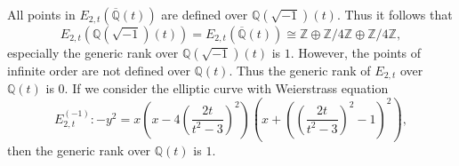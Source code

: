 \documentclass[main]{subfiles}
\begin{document}
\begin{rem}
    All points in $E_{2,t}(\overline{\mathbb{Q}}(t))$ are defined over $\mathbb{Q}(\sqrt{-1})(t)$.
    Thus it follows that
    \begin{equation*}
        E_{2,t}(\mathbb{Q}({\sqrt{-1}})(t)) = E_{2,t}(\overline{\mathbb{Q}}(t)) \cong \mathbb{Z} \oplus \mathbb{Z} / 4 \mathbb{Z} \oplus \mathbb{Z} / 4 \mathbb{Z},
    \end{equation*}
    especially the generic rank over $\mathbb{Q}(\sqrt{-1})(t)$ is $1$.
    However, the points of infinite order are not defined over $\mathbb{Q}(t)$.
    Thus the generic rank of $E_{2,t}$ over $\mathbb{Q}(t)$ is $0$.
    If we consider the elliptic curve with Weierstrass equation
    \begin{equation*}
        E_{2,t}^{(-1)}: -y^{2} = x \left(x - 4 \left(\frac{2t}{t^{2} - 3} \right)^{2} \right) \left(x + \left(\left(\frac{2t}{t^{2} - 3} \right)^{2} - 1 \right)^{2} \right),
    \end{equation*}
    then the generic rank over $\mathbb{Q}(t)$ is $1$.
\end{rem}
\end{document}
